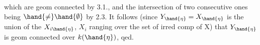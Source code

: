 
which are geom connected  by 3.1., and  the intersection
of two consecutive ones being $\hand{\neq} \hand{\emptyset}$ by 2.3. It follows (since
$Y_{\hand{\eta}} = X_{\hand{\eta}}$ is the union of the $X_{i\hand{\eta}}$, $X_i$ ranging over the set of irred
comp of X) that  $Y_{\hand{\eta}}$ is geom connected over $k(\hand{\eta})$, qed.

